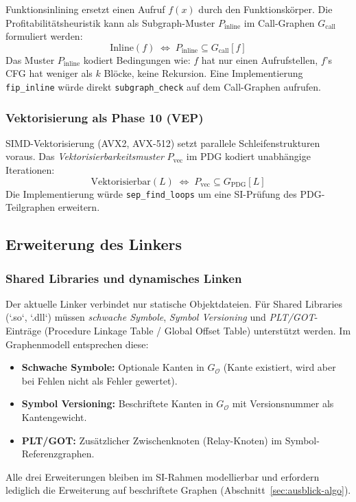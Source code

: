 ﻿\documentclass[a4paper,12pt]{article}
\theoremstyle{definition}
\begin{document}
Funktionsinlining ersetzt einen Aufruf $f(x)$ durch den Funktionskörper.
Die Profitabilitätsheuristik kann als Subgraph-Muster $P_{\mathrm{inline}}$
im Call-Graphen $G_{\mathrm{call}}$ formuliert werden:
\[
\text{Inline}(f) \;\Leftrightarrow\; P_{\mathrm{inline}} \subseteq G_{\mathrm{call}}[f]
\]
Das Muster $P_{\mathrm{inline}}$ kodiert Bedingungen wie: $f$ hat
nur einen Aufrufstellen, $f$'s CFG hat weniger als $k$ Blöcke,
keine Rekursion. Eine Implementierung \texttt{fip\_inline} würde
direkt \texttt{subgraph\_check} auf dem Call-Graphen aufrufen.

\subsubsection{Vektorisierung als Phase 10 (VEP)}

SIMD-Vektorisierung (AVX2, AVX-512) setzt parallele Schleifenstrukturen
voraus. Das \emph{Vektorisierbarkeitsmuster} $P_{\mathrm{vec}}$ im PDG
kodiert unabhängige Iterationen:
\[
\text{Vektorisierbar}(L) \;\Leftrightarrow\; P_{\mathrm{vec}} \subseteq
G_{\mathrm{PDG}}[L]
\]
Die Implementierung würde \texttt{sep\_find\_loops} um eine
SI-Prüfung des PDG-Teilgraphen erweitern.

\subsection{Erweiterung des Linkers}
\label{sec:ausblick-linker}

\subsubsection{Shared Libraries und dynamisches Linken}

Der aktuelle Linker verbindet nur statische Objektdateien. Für Shared
Libraries (`.so`, `.dll`) müssen \emph{schwache Symbole}, \emph{Symbol
	Versioning} und \emph{PLT/GOT}-Einträge (Procedure Linkage Table /
Global Offset Table) unterstützt werden. Im Graphenmodell entsprechen
diese:
\begin{itemize}
	\item \textbf{Schwache Symbole:} Optionale Kanten in $G_{\mathcal{O}}$
	(Kante existiert, wird aber bei Fehlen nicht als Fehler gewertet).
	\item \textbf{Symbol Versioning:} Beschriftete Kanten in
	$G_{\mathcal{O}}$ mit Versionsnummer als Kantengewicht.
	\item \textbf{PLT/GOT:} Zusätzlicher Zwischenknoten (Relay-Knoten)
	im Symbol-Referenzgra\-phen.
\end{itemize}
Alle drei Erweiterungen bleiben im SI-Rahmen modellierbar und erfordern
lediglich die Erweiterung auf beschriftete Graphen
(Abschnitt~\ref{sec:ausblick-algo}).
\end{document}
